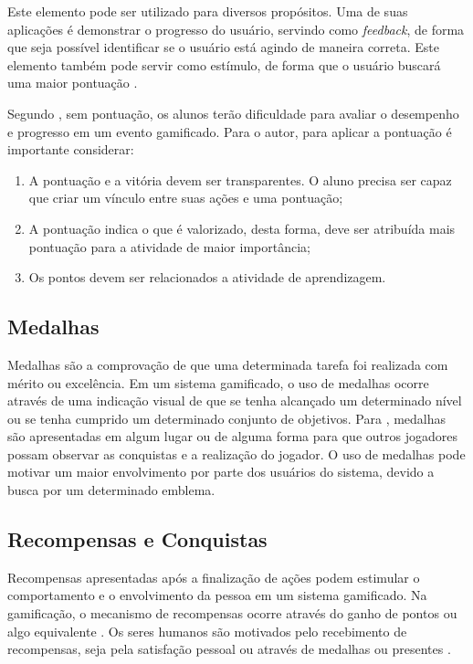 \documentclass[
	12pt,				%
	oneside,			%
	a4paper,			%
	english,			%
	french,				%
	spanish,			%
	brazil,				%
	]{abntex2}
\begin{document}
Este elemento pode ser utilizado para diversos propósitos. Uma de suas aplicações é demonstrar o progresso do usuário, servindo como \textit{feedback}, de forma que seja possível identificar se o usuário está agindo de maneira correta. Este elemento também pode servir como estímulo, de forma que o usuário buscará uma maior pontuação \cite{kaap:2014}.

Segundo \citet{andre2018}, sem pontuação, os alunos terão dificuldade para avaliar o desempenho e progresso em um evento gamificado. Para o autor, para aplicar a pontuação é importante considerar:

\begin{enumerate}
\item A pontuação e a vitória devem ser transparentes. O aluno precisa ser capaz que criar um vínculo entre suas ações e uma pontuação;
\item A pontuação indica o que é valorizado, desta forma, deve ser atribuída mais pontuação para a atividade de maior importância;
\item Os pontos devem ser relacionados a atividade de aprendizagem.
\end{enumerate}

\subsection{Medalhas}

Medalhas são a comprovação de que uma determinada tarefa foi realizada com mérito ou excelência. Em um sistema gamificado, o uso de medalhas ocorre através de uma indicação visual de que se tenha alcançado um determinado nível ou se tenha cumprido um determinado conjunto de objetivos. Para \citet{deterding2011game}, medalhas são apresentadas em algum lugar ou de alguma forma para que outros jogadores possam observar as conquistas e a realização do jogador. O uso de medalhas pode motivar um maior envolvimento por parte dos usuários do sistema, devido a busca por um determinado emblema.
    
\subsection{Recompensas e Conquistas}    

Recompensas apresentadas após a finalização de ações podem estimular o comportamento e o envolvimento da pessoa em um sistema gamificado. Na gamificação, o mecanismo de recompensas ocorre através do ganho de pontos ou algo equivalente \cite{kaap:2014}. Os seres humanos são motivados pelo recebimento de recompensas, seja pela satisfação pessoal ou através de medalhas ou presentes \cite{quadros2016gamificaccao}.
\end{document}
